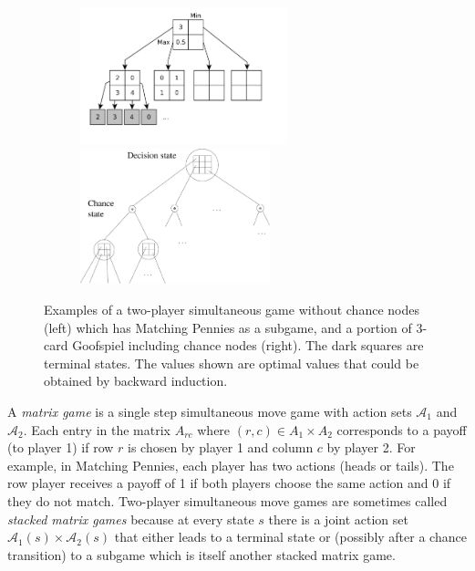 \documentclass[preprint,12pt]{elsarticle}
\newcommand{\cA}{\mathcal{A}}
\begin{document}
\begin{figure}[b!]
\centering
\begin{subfigure}{12cm}
\centering
\includegraphics[width=6.0cm]{figures/tree} \hspace{0.03cm} \includegraphics[width=5.5cm]{figures/goof3}\\
\end{subfigure}%
\caption{Examples of a two-player simultaneous game without chance nodes (left) which has Matching Pennies as a 
subgame, and a portion of 3-card Goofspiel including chance nodes (right).
The dark squares are terminal states. The values shown are optimal values that could be obtained by backward induction.\\
\label{fig:example}}
\end{figure}

A {\it matrix game} is a single step simultaneous move game with action sets $\cA_1$ and $\cA_2$. 
Each entry in the matrix $A_{rc}$ where $(r,c) \in A_1 \times A_2$ corresponds to a payoff (to player 1) if row $r$ is 
chosen by player 1 and column $c$ by player 2. 
For example, in Matching Pennies, each player has two actions (heads or tails). The row player receives a payoff of 1 
if both players choose the same action and 0 if they do not match. 
Two-player simultaneous move games are sometimes called {\it stacked matrix games} because at every state 
$s$ there is a joint action set $\cA_1(s) \times \cA_2(s)$ that either leads to a terminal state or (possibly after a 
chance transition) to a subgame which is itself another stacked matrix game. 
\end{document}
